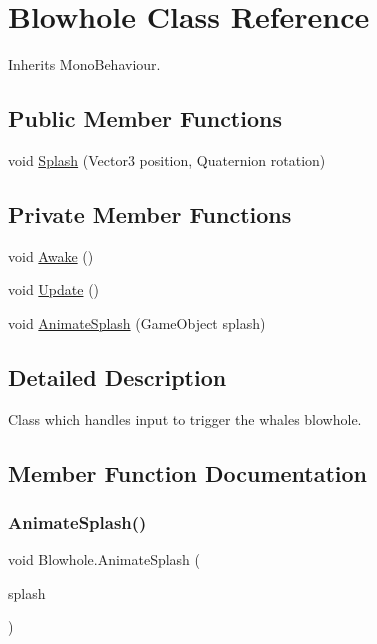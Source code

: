 \hypertarget{class_blowhole}{}\section{Blowhole Class Reference}
\label{class_blowhole}


Inherits Mono\+Behaviour.

\subsection*{Public Member Functions}
\begin{DoxyCompactItemize}
\item 
void \hyperlink{class_blowhole_ab1aebd5e7a3694f00edc95874f453159}{Splash} (Vector3 position, Quaternion rotation)
\end{DoxyCompactItemize}
\subsection*{Private Member Functions}
\begin{DoxyCompactItemize}
\item 
void \hyperlink{class_blowhole_a1f3c65dc793a21c7eb7ea3fdb3343147}{Awake} ()
\item 
void \hyperlink{class_blowhole_a2be62f8ab9936a90cc8aa90e30f9272c}{Update} ()
\item 
void \hyperlink{class_blowhole_ad09ba8046d84ff5362b89a6a71d8b086}{Animate\+Splash} (Game\+Object splash)
\end{DoxyCompactItemize}


\subsection{Detailed Description}
Class which handles input to trigger the whale\textquotesingle{}s blowhole. 



\subsection{Member Function Documentation}
\mbox{\label{class_blowhole_ad09ba8046d84ff5362b89a6a71d8b086}} 
\subsubsection{\texorpdfstring{Animate\+Splash()}{AnimateSplash()}}
{\footnotesize\ttfamily void Blowhole.\+Animate\+Splash (\begin{DoxyParamCaption}\item[{Game\+Object}]{splash }\end{DoxyParamCaption})\hspace{0.3cm}{\ttfamily [private]}}



